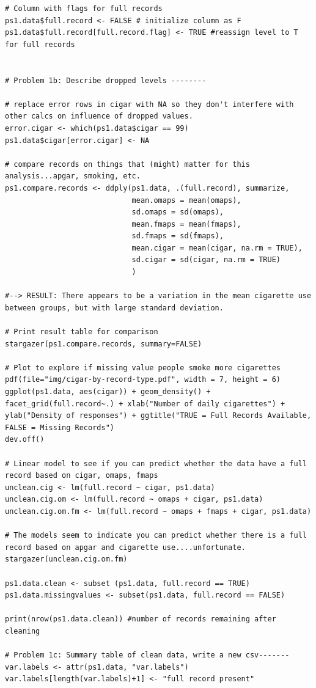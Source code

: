 \documentclass[a4paper, 12pt]{article}
\begin{document}
\begin{verbatim}
# Column with flags for full records
ps1.data$full.record <- FALSE # initialize column as F
ps1.data$full.record[full.record.flag] <- TRUE #reassign level to T for full records


# Problem 1b: Describe dropped levels --------

# replace error rows in cigar with NA so they don't interfere with other calcs on influence of dropped values.
error.cigar <- which(ps1.data$cigar == 99)
ps1.data$cigar[error.cigar] <- NA

# compare records on things that (might) matter for this analysis...apgar, smoking, etc.
ps1.compare.records <- ddply(ps1.data, .(full.record), summarize,
                             mean.omaps = mean(omaps),
                             sd.omaps = sd(omaps), 
                             mean.fmaps = mean(fmaps),
                             sd.fmaps = sd(fmaps),
                             mean.cigar = mean(cigar, na.rm = TRUE), 
                             sd.cigar = sd(cigar, na.rm = TRUE)
                             )

#--> RESULT: There appears to be a variation in the mean cigarette use between groups, but with large standard deviation.

# Print result table for comparison
stargazer(ps1.compare.records, summary=FALSE)

# Plot to explore if missing value people smoke more cigarettes
pdf(file="img/cigar-by-record-type.pdf", width = 7, height = 6)
ggplot(ps1.data, aes(cigar)) + geom_density() + facet_grid(full.record~.) + xlab("Number of daily cigarettes") + ylab("Density of responses") + ggtitle("TRUE = Full Records Available, FALSE = Missing Records")
dev.off()

# Linear model to see if you can predict whether the data have a full record based on cigar, omaps, fmaps
unclean.cig <- lm(full.record ~ cigar, ps1.data)
unclean.cig.om <- lm(full.record ~ omaps + cigar, ps1.data)
unclean.cig.om.fm <- lm(full.record ~ omaps + fmaps + cigar, ps1.data)

# The models seem to indicate you can predict whether there is a full record based on apgar and cigarette use....unfortunate.  
stargazer(unclean.cig.om.fm)

ps1.data.clean <- subset (ps1.data, full.record == TRUE)
ps1.data.missingvalues <- subset(ps1.data, full.record == FALSE)

print(nrow(ps1.data.clean)) #number of records remaining after cleaning

# Problem 1c: Summary table of clean data, write a new csv-------
var.labels <- attr(ps1.data, "var.labels")
var.labels[length(var.labels)+1] <- "full record present"


\end{verbatim}
\end{document}
